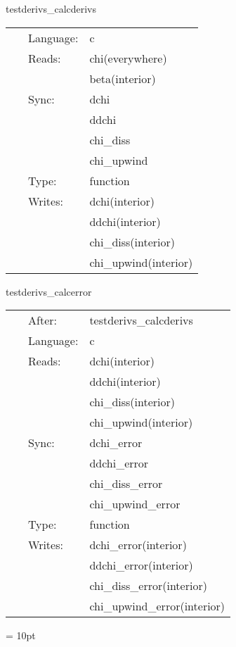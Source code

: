 \hspace{5mm} testderivs\_calcderivs 

\hspace{5mm}{\it calculate derivs } 


\hspace{5mm}

 \begin{tabular*}{160mm}{cll} 
~ & Language:  & c \\ 
~ & Reads:  & chi(everywhere) \\ 
~& ~ &beta(interior)\\ 
~ & Sync:  & dchi \\ 
~& ~ &ddchi\\ 
~& ~ &chi\_diss\\ 
~& ~ &chi\_upwind\\ 
~ & Type:  & function \\ 
~ & Writes:  & dchi(interior) \\ 
~& ~ &ddchi(interior)\\ 
~& ~ &chi\_diss(interior)\\ 
~& ~ &chi\_upwind(interior)\\ 
\end{tabular*} 


\vspace{5mm}


\hspace{5mm} testderivs\_calcerror 

\hspace{5mm}{\it calculate derivs error } 


\hspace{5mm}

 \begin{tabular*}{160mm}{cll} 
~ & After:  & testderivs\_calcderivs \\ 
~ & Language:  & c \\ 
~ & Reads:  & dchi(interior) \\ 
~& ~ &ddchi(interior)\\ 
~& ~ &chi\_diss(interior)\\ 
~& ~ &chi\_upwind(interior)\\ 
~ & Sync:  & dchi\_error \\ 
~& ~ &ddchi\_error\\ 
~& ~ &chi\_diss\_error\\ 
~& ~ &chi\_upwind\_error\\ 
~ & Type:  & function \\ 
~ & Writes:  & dchi\_error(interior) \\ 
~& ~ &ddchi\_error(interior)\\ 
~& ~ &chi\_diss\_error(interior)\\ 
~& ~ &chi\_upwind\_error(interior)\\ 
\end{tabular*} 



\vspace{5mm}\parskip = 10pt 

